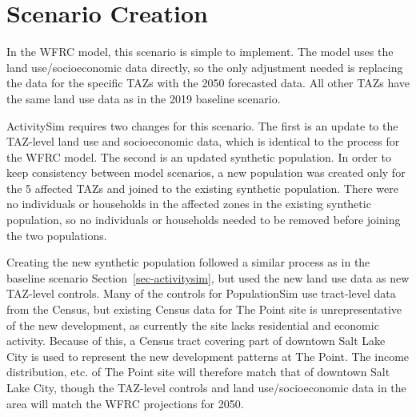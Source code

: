 \documentclass[fancy, twoside, mastersfancy, ms]{byuthesis}
\begin{document}
\begin{table}

\caption{\label{tbl-the-point-data-new}TAZ-level Socioeconomic Data for
The Point (Land Use Scenario)}


\end{table}%

\section{Scenario Creation}\label{scenario-creation}

In the WFRC model, this scenario is simple to implement. The model uses
the land use/socioeconomic data directly, so the only adjustment needed
is replacing the data for the specific TAZs with the 2050 forecasted
data. All other TAZs have the same land use data as in the 2019 baseline
scenario.

ActivitySim requires two changes for this scenario. The first is an
update to the TAZ-level land use and socioeconomic data, which is
identical to the process for the WFRC model. The second is an updated
synthetic population. In order to keep consistency between model
scenarios, a new population was created only for the 5 affected TAZs and
joined to the existing synthetic population. There were no individuals
or households in the affected zones in the existing synthetic
population, so no individuals or households needed to be removed before
joining the two populations.

Creating the new synthetic population followed a similar process as in
the baseline scenario Section~\ref{sec-activitysim}, but used the new
land use data as new TAZ-level controls. Many of the controls for
PopulationSim use tract-level data from the Census, but existing Census
data for The Point site is unrepresentative of the new development, as
currently the site lacks residential and economic activity. Because of
this, a Census tract covering part of downtown Salt Lake City is used to
represent the new development patterns at The Point. The income
distribution, etc. of The Point site will therefore match that of
downtown Salt Lake City, though the TAZ-level controls and land
use/socioeconomic data in the area will match the WFRC projections for
2050.
\end{document}

